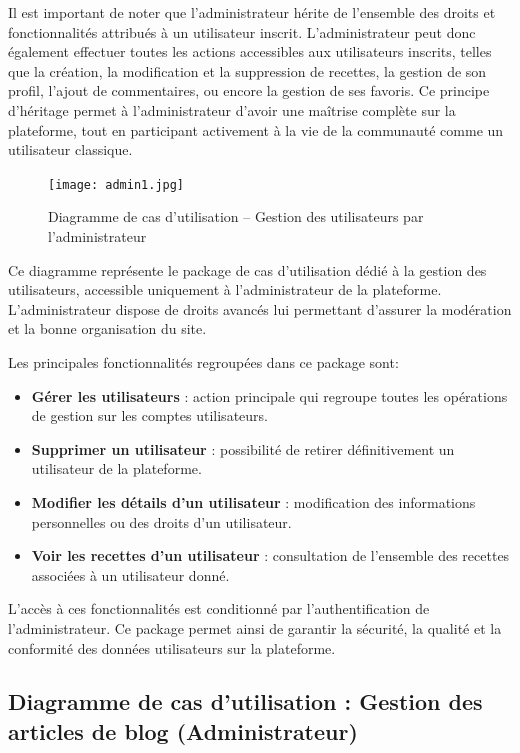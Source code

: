 \documentclass[12pt,a4paper]{report}
\begin{document}
Il est important de noter que l’administrateur hérite de l’ensemble des droits et fonctionnalités attribués à un utilisateur inscrit. L’administrateur peut donc également effectuer toutes les actions accessibles aux utilisateurs inscrits, telles que la création, la modification et la suppression de recettes, la gestion de son profil, l’ajout de commentaires, ou encore la gestion de ses favoris. Ce principe d’héritage permet à l’administrateur d’avoir une maîtrise complète sur la plateforme, tout en participant activement à la vie de la communauté comme un utilisateur classique.

\begin{figure}[H]
    \centering
    \texttt{[image: admin1.jpg]}
    \caption{Diagramme de cas d’utilisation – Gestion des utilisateurs par l’administrateur}
    \label{fig:usecase_admin_utilisateur}
\end{figure}

Ce diagramme représente le package de cas d’utilisation dédié à la gestion des utilisateurs, accessible uniquement à l’administrateur de la plateforme. L’administrateur dispose de droits avancés lui permettant d’assurer la modération et la bonne organisation du site.

Les principales fonctionnalités regroupées dans ce package sont:
\begin{itemize}
    \item \textbf{Gérer les utilisateurs} : action principale qui regroupe toutes les opérations de gestion sur les comptes utilisateurs.
    \item \textbf{Supprimer un utilisateur} : possibilité de retirer définitivement un utilisateur de la plateforme.
    \item \textbf{Modifier les détails d’un utilisateur} : modification des informations personnelles ou des droits d’un utilisateur.
    \item \textbf{Voir les recettes d’un utilisateur} : consultation de l’ensemble des recettes associées à un utilisateur donné.
\end{itemize}

L’accès à ces fonctionnalités est conditionné par l’authentification de l’administrateur. Ce package permet ainsi de garantir la sécurité, la qualité et la conformité des données utilisateurs sur la plateforme.
\subsection{Diagramme de cas d’utilisation : Gestion des articles de blog (Administrateur)}
\end{document}

